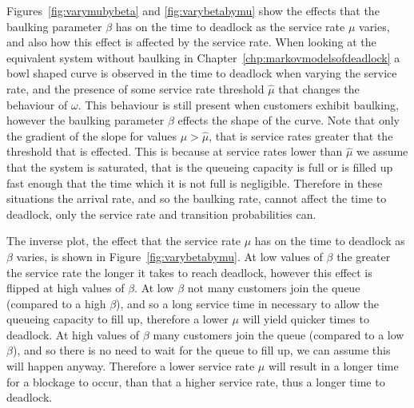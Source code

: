 \documentclass{article}
\begin{document}
Figures~\ref{fig:varymubybeta} and \ref{fig:varybetabymu} show the effects that the baulking parameter $\beta$ has on the time to deadlock as the service rate $\mu$ varies, and also how this effect is affected by the service rate.
When looking at the equivalent system without baulking in Chapter~\ref{chp:markovmodelsofdeadlock} a bowl shaped curve is observed in the time to deadlock when varying the service rate, and the presence of some service rate threshold $\hat{\mu}$ that changes the behaviour of $\omega$.
This behaviour is still present when customers exhibit baulking, however the baulking parameter $\beta$ effects the shape of the curve. Note that only the gradient of the slope for values $\mu > \hat{\mu}$, that is service rates greater that the threshold that is effected.
This is because at service rates lower than $\hat{\mu}$ we assume that the system is saturated, that is the queueing capacity is full or is filled up fast enough that the time which it is not full is negligible.
Therefore in these situations the arrival rate, and so the baulking rate, cannot affect the time to deadlock, only the service rate and transition probabilities can.

The inverse plot, the effect that the service rate $\mu$ has on the time to deadlock as $\beta$ varies, is shown in Figure~\ref{fig:varybetabymu}.
At low values of $\beta$ the greater the service rate the longer it takes to reach deadlock, however this effect is flipped at high values of $\beta$.
At low $\beta$ not many customers join the queue (compared to a high $\beta$), and so a long service time in necessary to allow the queueing capacity to fill up, therefore a lower $\mu$ will yield quicker times to deadlock.
At high values of $\beta$ many customers join the queue (compared to a low $\beta$), and so there is no need to wait for the queue to fill up, we can assume this will happen anyway.
Therefore a lower service rate $\mu$ will result in a longer time for a blockage to occur, than that a higher service rate, thus a longer time to deadlock.
\end{document}
